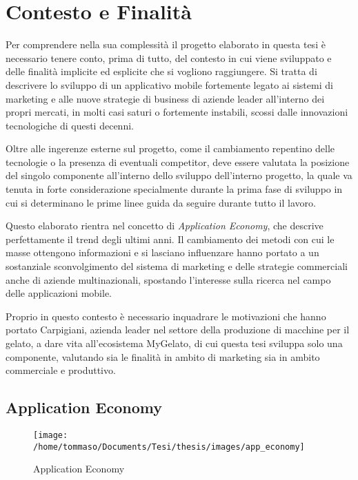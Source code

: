 
\chapter{Contesto e Finalità}

Per comprendere nella sua complessità il progetto elaborato in questa
tesi è necessario tenere conto, prima di tutto, del contesto in cui
viene sviluppato e delle finalità implicite ed esplicite che si vogliono
raggiungere. Si tratta di descrivere lo sviluppo di un applicativo
mobile fortemente legato ai sistemi di marketing e alle nuove strategie
di business di aziende leader all'interno dei propri mercati, in molti
casi saturi o fortemente instabili, scossi dalle innovazioni tecnologiche
di questi decenni.

Oltre alle ingerenze esterne sul progetto, come il cambiamento repentino
delle tecnologie o la presenza di eventuali competitor, deve essere
valutata la posizione del singolo componente all'interno dello sviluppo
dell'interno progetto, la quale va tenuta in forte considerazione
specialmente durante la prima fase di sviluppo in cui si determinano
le prime linee guida da seguire durante tutto il lavoro.

Questo elaborato rientra nel concetto di \textit{Application Economy},
che descrive perfettamente il trend degli ultimi anni. Il cambiamento
dei metodi con cui le masse ottengono informazioni e si lasciano influenzare
hanno portato a un sostanziale sconvolgimento del sistema di marketing
e delle strategie commerciali anche di aziende multinazionali, spostando
l'interesse sulla ricerca nel campo delle applicazioni mobile.

Proprio in questo contesto è necessario inquadrare le motivazioni
che hanno portato Carpigiani, azienda leader nel settore della produzione
di macchine per il gelato, a dare vita all'ecosistema MyGelato, di
cui questa tesi sviluppa solo una componente, valutando sia le finalità
in ambito di marketing sia in ambito commerciale e produttivo.

\section{Application Economy}

\begin{figure}[H]
\centering{}\texttt{[image: /home/tommaso/Documents/Tesi/thesis/images/app\_economy]}
\caption{\label{fig:appEconomy1} Application Economy}
\end{figure}

